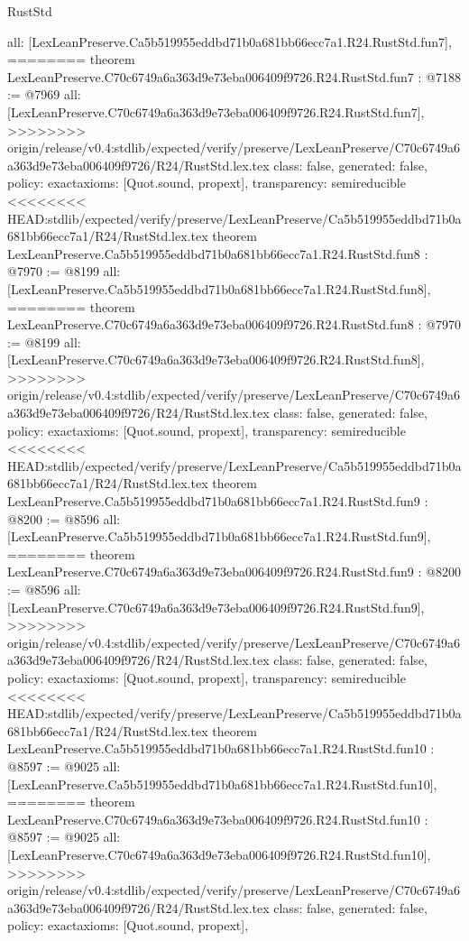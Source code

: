 \begin{lexlean}{RustStd}
\begin{coremodule}
{\begin{coremodule}
{{{{{{{{{{  all: [LexLeanPreserve.Ca5b519955eddbd71b0a681bb66ecc7a1.R24.RustStd.fun7],
========
theorem LexLeanPreserve.C70c6749a6a363d9e73eba006409f9726.R24.RustStd.fun7 : @7188 := @7969 {
  all: [LexLeanPreserve.C70c6749a6a363d9e73eba006409f9726.R24.RustStd.fun7],
>>>>>>>> origin/release/v0.4:stdlib/expected/verify/preserve/LexLeanPreserve/C70c6749a6a363d9e73eba006409f9726/R24/RustStd.lex.tex
  class: false,
  generated: false,
  policy: exact{axioms: [Quot.sound, propext]},
  transparency: semireducible
}
<<<<<<<< HEAD:stdlib/expected/verify/preserve/LexLeanPreserve/Ca5b519955eddbd71b0a681bb66ecc7a1/R24/RustStd.lex.tex
theorem LexLeanPreserve.Ca5b519955eddbd71b0a681bb66ecc7a1.R24.RustStd.fun8 : @7970 := @8199 {
  all: [LexLeanPreserve.Ca5b519955eddbd71b0a681bb66ecc7a1.R24.RustStd.fun8],
========
theorem LexLeanPreserve.C70c6749a6a363d9e73eba006409f9726.R24.RustStd.fun8 : @7970 := @8199 {
  all: [LexLeanPreserve.C70c6749a6a363d9e73eba006409f9726.R24.RustStd.fun8],
>>>>>>>> origin/release/v0.4:stdlib/expected/verify/preserve/LexLeanPreserve/C70c6749a6a363d9e73eba006409f9726/R24/RustStd.lex.tex
  class: false,
  generated: false,
  policy: exact{axioms: [Quot.sound, propext]},
  transparency: semireducible
}
<<<<<<<< HEAD:stdlib/expected/verify/preserve/LexLeanPreserve/Ca5b519955eddbd71b0a681bb66ecc7a1/R24/RustStd.lex.tex
theorem LexLeanPreserve.Ca5b519955eddbd71b0a681bb66ecc7a1.R24.RustStd.fun9 : @8200 := @8596 {
  all: [LexLeanPreserve.Ca5b519955eddbd71b0a681bb66ecc7a1.R24.RustStd.fun9],
========
theorem LexLeanPreserve.C70c6749a6a363d9e73eba006409f9726.R24.RustStd.fun9 : @8200 := @8596 {
  all: [LexLeanPreserve.C70c6749a6a363d9e73eba006409f9726.R24.RustStd.fun9],
>>>>>>>> origin/release/v0.4:stdlib/expected/verify/preserve/LexLeanPreserve/C70c6749a6a363d9e73eba006409f9726/R24/RustStd.lex.tex
  class: false,
  generated: false,
  policy: exact{axioms: [Quot.sound, propext]},
  transparency: semireducible
}
<<<<<<<< HEAD:stdlib/expected/verify/preserve/LexLeanPreserve/Ca5b519955eddbd71b0a681bb66ecc7a1/R24/RustStd.lex.tex
theorem LexLeanPreserve.Ca5b519955eddbd71b0a681bb66ecc7a1.R24.RustStd.fun10 : @8597 := @9025 {
  all: [LexLeanPreserve.Ca5b519955eddbd71b0a681bb66ecc7a1.R24.RustStd.fun10],
========
theorem LexLeanPreserve.C70c6749a6a363d9e73eba006409f9726.R24.RustStd.fun10 : @8597 := @9025 {
  all: [LexLeanPreserve.C70c6749a6a363d9e73eba006409f9726.R24.RustStd.fun10],
>>>>>>>> origin/release/v0.4:stdlib/expected/verify/preserve/LexLeanPreserve/C70c6749a6a363d9e73eba006409f9726/R24/RustStd.lex.tex
  class: false,
  generated: false,
  policy: exact{axioms: [Quot.sound, propext]},
}}}}}}}}}}}}}}
\end{coremodule}}
\end{coremodule}
\end{lexlean}
